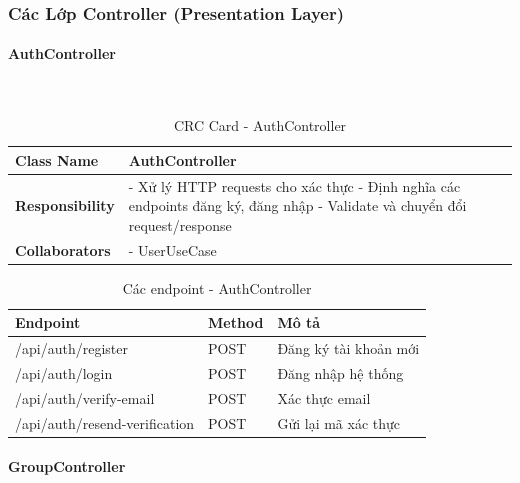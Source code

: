 \subsubsection{Các Lớp Controller (Presentation Layer)}

\paragraph{AuthController} ~\\

\begin{table}[H]
\small
\renewcommand{\arraystretch}{1.3}
\begin{tabularx}{\textwidth}{|>{\raggedright\arraybackslash}p{3.5cm}|X|}
\hline
\rowcolor{gray!20}
\textbf{Class Name} & AuthController \\
\hline
\textbf{Responsibility} & - Xử lý HTTP requests cho xác thực \newline - Định nghĩa các endpoints đăng ký, đăng nhập \newline - Validate và chuyển đổi request/response \\
\hline
\textbf{Collaborators} & - UserUseCase \\
\hline
\end{tabularx}
\caption{CRC Card - AuthController}
\end{table}

\begin{table}[H]
\small
\renewcommand{\arraystretch}{1.3}
\begin{tabularx}{\textwidth}{|>{\raggedright\arraybackslash}p{4.5cm}|>{\raggedright\arraybackslash}p{2cm}|X|}
\hline
\rowcolor{gray!20}
\textbf{Endpoint} & \textbf{Method} & \textbf{Mô tả} \\
\hline
/api/auth/register & POST & Đăng ký tài khoản mới \\
\hline
/api/auth/login & POST & Đăng nhập hệ thống \\
\hline
/api/auth/verify-email & POST & Xác thực email \\
\hline
/api/auth/resend-verification & POST & Gửi lại mã xác thực \\
\hline
\end{tabularx}
\caption{Các endpoint - AuthController}
\end{table}

\paragraph{GroupController} ~\\

